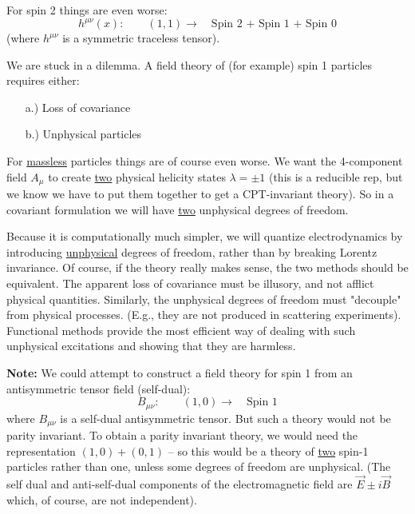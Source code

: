 \documentclass[letterpaper]{article}
\begin{document}
	\par For spin 2 things are even worse:
	$$h^{\mu\nu}(x): \qquad (1,1) \rightarrow \quad \text{Spin 2 + Spin 1 + Spin 0}$$
	(where $h^{\mu\nu}$ is a symmetric traceless tensor).
	\par We are stuck in a dilemma. A field theory of (for example) spin 1 particles requires either:
	\begin{enumerate}
	\item[a.)] Loss of covariance
	\item[b.)] Unphysical particles
	\end{enumerate}
	\par For \underline{massless} particles things are of course even worse. We want the 4-component field $A_\mu$ to create \underline{two} physical helicity states $\lambda = \pm 1$ (this is a reducible rep, but we know we have to put them together to get a CPT-invariant theory). So in a covariant formulation we will have \underline{two} unphysical degrees of freedom.
	\par Because it is computationally much simpler, we will quantize electrodynamics by introducing \underline{unphysical} degrees of freedom, rather than by breaking Lorentz invariance. Of course, if the theory really makes sense, the two methods should be equivalent. The apparent loss of covariance must be illusory, and not afflict physical quantities. Similarly, the unphysical degrees of freedom must "decouple" from physical processes. (E.g., they are not produced in scattering experiments). Functional methods provide the most efficient way of dealing with such unphysical excitations and showing that they are harmless.
	\par \textbf{Note:} We could attempt to construct a field theory for spin 1 from an antisymmetric tensor field (self-dual):
	$$B_{\mu\nu}: \qquad (1,0) \rightarrow \quad \text{Spin 1}$$
	where $B_{\mu\nu}$ is a self-dual antisymmetric tensor. But such a theory would not be parity invariant. To obtain a parity invariant theory, we would need the representation $(1,0) + (0,1)$ -- so this would be a theory of \underline{two} spin-1 particles rather than one, unless some degrees of freedom are unphysical. (The self dual and anti-self-dual components of the electromagnetic field are $\vec{E} \pm i\vec{B}$ which, of course, are not independent).
\end{document}
